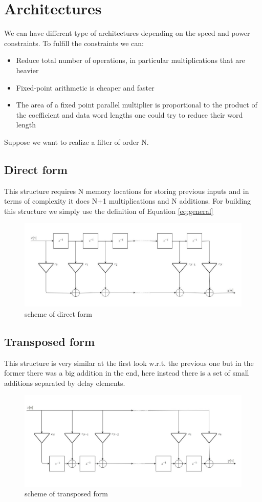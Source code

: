 \section{Architectures}
We can have different type of architectures depending on the speed and power constraints.
To fulfill the constraints we can:\\
\begin{itemize}
    \item Reduce total number of operations, in particular multiplications that are heavier
    \item Fixed-point arithmetic is cheaper and faster
    \item The area of a fixed point parallel multiplier is proportional to the product of the coefficient and data word lengths one could try to reduce their word length
\end{itemize}
Suppose we want to realize a filter of order N.
\subsection{Direct form}
This structure requires N memory locations for storing previous inputs and in terms of complexity it does N+1 multiplications and  N additions.  For building this structure we simply use the definition of Equation \ref{eq:general}
\begin{figure}[H]
    \centering
    \includegraphics[scale=0.45]{images/direct.jpeg}    
    \caption{scheme of direct form}
    \label{fig:my_label}
\end{figure}
\subsection{Transposed form}
This structure is very similar at the first look w.r.t. the previous one but in the former there was a big addition in the end, here instead there is a set of small additions separated by delay elements.
\begin{figure}[H]
    \centering
    \includegraphics[scale=0.45]{images/transposed.jpg}    
    \caption{scheme of transposed form}
    \label{fig:transposed}
\end{figure}
